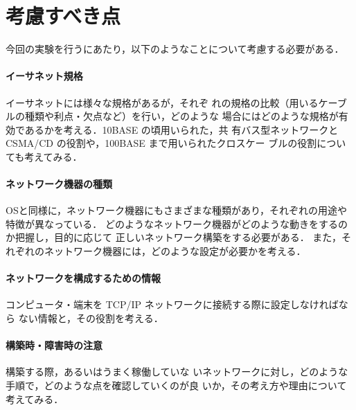\section{考慮すべき点}
今回の実験を行うにあたり，以下のようなことについて考慮する必要がある．

\paragraph{イーサネット規格} イーサネットには様々な規格があるが，それぞ
れの規格の比較（用いるケーブルの種類や利点・欠点など）を行い，どのような
場合にはどのような規格が有効であるかを考える．10BASE の頃用いられた，共
有バス型ネットワークとCSMA/CD の役割や，100BASE まで用いられたクロスケー
ブルの役割についても考えてみる．

\paragraph{ネットワーク機器の種類}
OSと同様に，ネットワーク機器にもさまざまな種類があり，それぞれの用途や特徴が異なっている．
どのようなネットワーク機器がどのような動きをするのか把握し，目的に応じて
正しいネットワーク構築をする必要がある．
また，それぞれのネットワーク機器には，どのような設定が必要かを考える．

\paragraph{ネットワークを構成するための情報}
コンピュータ・端末を TCP/IP ネットワークに接続する際に設定しなければなら
ない情報と，その役割を考える．

\paragraph{構築時・障害時の注意} 構築する際，あるいはうまく稼働していな
いネットワークに対し，どのような手順で，どのような点を確認していくのが良
いか，その考え方や理由について考えてみる．

\clearpage

